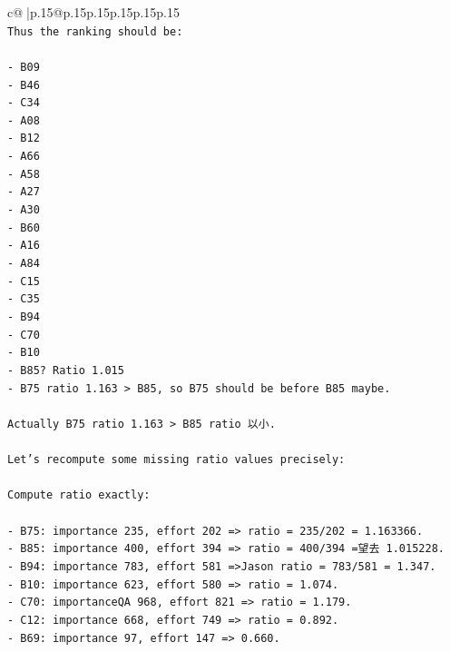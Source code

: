 \documentclass{article}
\begin{document}
{\begin{supertabular}{c@{$\;$}|p{.15\linewidth}@{}p{.15\linewidth}p{.15\linewidth}p{.15\linewidth}p{.15\linewidth}p{.15\linewidth}}
{{{\\ 
\texttt{Thus the ranking should be:} \\
\\ 
\texttt{{-} B09} \\
\texttt{{-} B46} \\
\texttt{{-} C34} \\
\texttt{{-} A08} \\
\texttt{{-} B12} \\
\texttt{{-} A66} \\
\texttt{{-} A58} \\
\texttt{{-} A27} \\
\texttt{{-} A30} \\
\texttt{{-} B60} \\
\texttt{{-} A16} \\
\texttt{{-} A84} \\
\texttt{{-} C15} \\
\texttt{{-} C35} \\
\texttt{{-} B94} \\
\texttt{{-} C70} \\
\texttt{{-} B10} \\
\texttt{{-} B85? Ratio 1.015} \\
\texttt{{-} B75 ratio 1.163 > B85, so B75 should be before B85 maybe.} \\
\\ 
\texttt{Actually B75 ratio 1.163 > B85 ratio 以小.} \\
\\ 
\texttt{Let's recompute some missing ratio values precisely:} \\
\\ 
\texttt{Compute ratio exactly:} \\
\\ 
\texttt{{-} B75: importance 235, effort 202 => ratio = 235/202 = 1.163366.} \\
\texttt{{-} B85: importance 400, effort 394 => ratio = 400/394 =望去 1.015228.} \\
\texttt{{-} B94: importance 783, effort 581 =>Jason ratio = 783/581 = 1.347.} \\
\texttt{{-} B10: importance 623, effort 580 => ratio = 1.074.} \\
\texttt{{-} C70: importanceQA 968, effort 821 => ratio = 1.179.} \\
\texttt{{-} C12: importance 668, effort 749 => ratio = 0.892.} \\
\texttt{{-} B69: importance 97, effort 147 => 0.660.} \\
}}}
\end{supertabular}}
\end{document}

